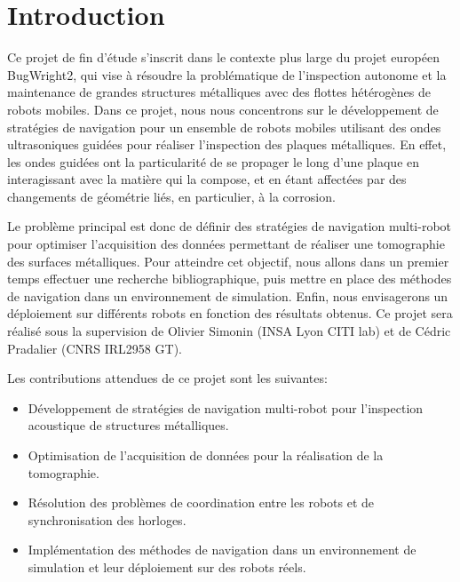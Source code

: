 \documentclass[francais,RandD]{rapportPFE}
\begin{document}
	\section{Introduction}
		Ce projet de fin d'étude s'inscrit dans le contexte plus large du projet européen BugWright2, qui vise à résoudre la problématique de l'inspection autonome et la maintenance de grandes structures métalliques avec des flottes hétérogènes de robots mobiles. Dans ce projet, nous nous concentrons sur le développement de stratégies de navigation pour un ensemble de robots mobiles utilisant des ondes ultrasoniques guidées pour réaliser l'inspection des plaques métalliques. En effet, les ondes guidées ont la particularité de se propager le long d'une plaque en interagissant avec la matière qui la compose, et en étant affectées par des changements de géométrie liés, en particulier, à la corrosion.

		Le problème principal est donc de définir des stratégies de navigation multi-robot pour optimiser l'acquisition des données permettant de réaliser une tomographie des surfaces métalliques. Pour atteindre cet objectif, nous allons dans un premier temps effectuer une recherche bibliographique, puis mettre en place des méthodes de navigation dans un environnement de simulation. Enfin, nous envisagerons un déploiement sur différents robots en fonction des résultats obtenus. Ce projet sera réalisé sous la supervision de Olivier Simonin (INSA Lyon CITI lab) et de Cédric Pradalier (CNRS IRL2958 GT).

		Les contributions attendues de ce projet sont les suivantes:
		\begin{itemize}
			\item Développement de stratégies de navigation multi-robot pour l'inspection acoustique de structures métalliques.
			\item Optimisation de l'acquisition de données pour la réalisation de la tomographie.
			\item Résolution des problèmes de coordination entre les robots et de synchronisation des horloges.
			\item Implémentation des méthodes de navigation dans un environnement de simulation et leur déploiement sur des robots réels.
		\end{itemize}
\end{document}
